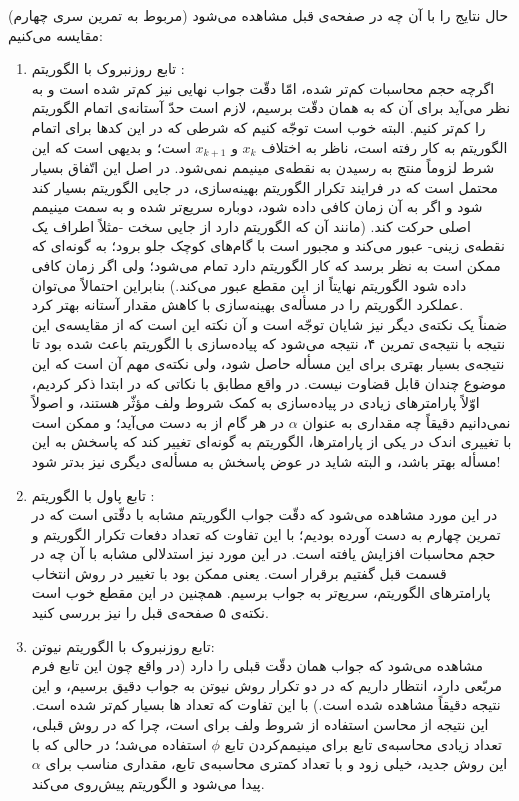 \documentclass[a4paper]{article}
\theoremstyle{plain}
\theoremstyle{definition}
\theoremstyle{remark}
\begin{document}
حال نتایج را با آن چه در صفحه‌ی قبل مشاهده می‌شود (مربوط به تمرین سری چهارم) مقایسه می‌کنیم:
\begin{enumerate}
	\item 
	تابع روزنبروک با الگوریتم :\\
	اگرچه حجم محاسبات کم‌تر شده، امّا دقّت جواب نهایی نیز کم‌تر شده است و به نظر می‌آید برای آن که به همان دقّت برسیم، لازم است حدّ آستانه‌ی اتمام الگوریتم را کم‌تر کنیم. البته خوب است توجّه کنیم که شرطی که در این کدها برای اتمام الگوریتم به کار رفته است، ناظر به اختلاف $ x_k $ و $ x_{k+1} $ است؛ و بدیهی است که این شرط لزوماً منتج به رسیدن به نقطه‌ی مینیمم نمی‌شود. در اصل این اتّفاق بسیار محتمل است که در فرایند تکرار الگوریتم بهینه‌سازی، در جایی الگوریتم بسیار کند شود و اگر به آن زمان کافی داده شود، دوباره سریع‌تر شده و به سمت مینیمم اصلی حرکت کند. (مانند آن که الگوریتم دارد از جایی سخت -مثلاً اطراف یک نقطه‌ی زینی- عبور می‌کند و مجبور است با گام‌های کوچک جلو برود؛ به گونه‌ای که ممکن است به نظر برسد که کار الگوریتم دارد تمام می‌شود؛ ولی اگر زمان کافی داده شود الگوریتم نهایتاً از این مقطع عبور می‌کند.) بنابراین احتمالاً می‌توان عملکرد الگوریتم را در مسأله‌ی بهینه‌سازی با کاهش مقدار آستانه بهتر کرد.\\
	ضمناً یک نکته‌ی دیگر نیز شایان توجّه است و آن نکته این است که از مقایسه‌ی این نتیجه با نتیجه‌ی تمرین ۴، نتیجه می‌شود که پیاده‌سازی  با الگوریتم  باعث شده بود تا نتیجه‌ی بسیار بهتری برای این مسأله حاصل شود، ولی نکته‌ی مهم آن است که این موضوع چندان قابل قضاوت نیست. در واقع مطابق با نکاتی که در ابتدا ذکر کردیم، اوّلاً پارامترهای زیادی در پیاده‌سازی به کمک شروط ولف مؤثّر هستند، و اصولاً نمی‌دانیم دقیقاً چه مقداری به عنوان $ \alpha $ در هر گام از  به دست می‌آید؛ و ممکن است با تغییری اندک در یکی از پارامترها، الگوریتم به گونه‌ای تغییر کند که پاسخش به این مسأله بهتر باشد، و البته شاید در عوض پاسخش به مسأله‌ی دیگری نیز بدتر شود!
	\item 
	تابع پاول با الگوریتم :\\
	در این مورد مشاهده می‌شود که دقّت جواب الگوریتم مشابه با دقّتی است که در تمرین چهارم به دست آورده بودیم؛ با این تفاوت که تعداد دفعات تکرار الگوریتم و حجم محاسبات افزایش یافته است. در این مورد نیز استدلالی مشابه با آن چه در قسمت قبل گفتیم برقرار است. یعنی ممکن بود با تغییر در روش انتخاب پارامترهای الگوریتم، سریع‌تر به جواب برسیم. همچنین در این مقطع خوب است نکته‌ی ۵ صفحه‌ی قبل را نیز بررسی کنید.
	\item 
	تابع روزنبروک با الگوریتم نیوتن:\\
	مشاهده می‌شود که جواب همان دقّت قبلی را دارد (در واقع چون این تابع فرم مربّعی دارد، انتظار داریم که در دو تکرار روش نیوتن به جواب دقیق برسیم، و این نتیجه دقیقاً مشاهده شده است.) با این تفاوت که تعداد ها بسیار کم‌تر شده است. این نتیجه از محاسن استفاده از شروط ولف برای  است، چرا که در روش قبلی، تعداد زیادی محاسبه‌ی تابع برای مینیمم‌کردن تابع $ \phi $ استفاده می‌شد؛ در حالی که با این روش جدید، خیلی زود و با تعداد کمتری محاسبه‌ی تابع، مقداری مناسب برای $ \alpha $ پیدا می‌شود و الگوریتم پیش‌روی می‌کند.

\end{enumerate}
\end{document}
